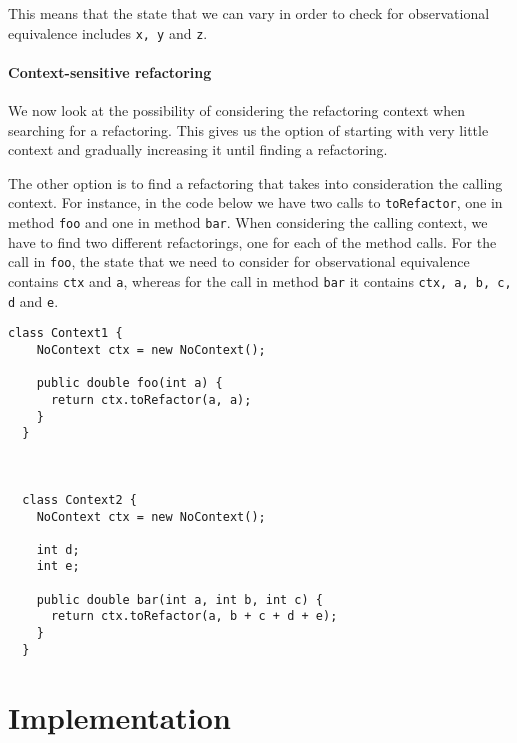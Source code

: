 \documentclass[runningheads,a4paper]{llncs}
\begin{document}
This means that the state that we can vary in order to check for
observational equivalence includes \texttt{x, y} and \texttt{z}.

\paragraph{Context-sensitive refactoring}
We now look at the possibility of considering the refactoring context
when searching for a refactoring. This gives us the option of starting
with very little context and gradually increasing it until finding a
refactoring. 

The other option is to find a refactoring that takes into consideration
the calling context. For instance, in the code below we have two
calls to \texttt{toRefactor}, one in method \texttt{foo} and one in
method \texttt{bar}. When considering the calling context, we have to
find two different refactorings, one for each of the method calls.
For the call in \texttt{foo}, the state that we need to consider for observational
equivalence contains \texttt{ctx} and \texttt{a}, whereas for the call in method
\texttt{bar} it contains \texttt{ctx, a, b, c, d} and \texttt{e}.

\begin{lstlisting}[mathescape=true]
  class Context1 {
    NoContext ctx = new NoContext();

    public double foo(int a) {
      return ctx.toRefactor(a, a);
    }
  }

 

  class Context2 {
    NoContext ctx = new NoContext();

    int d;
    int e;

    public double bar(int a, int b, int c) {
      return ctx.toRefactor(a, b + c + d + e);
    }
  }
\end{lstlisting}






\section{Implementation}
\end{document}
